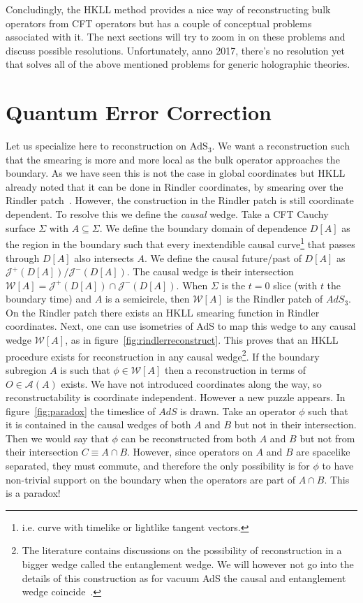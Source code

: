 \documentclass{PoS}
\newcommand{\Am}{\ensuremath{\mathcal{A}}}
\newcommand{\LF}{\left(}
\newcommand{\RF}{\right)}
\begin{document}
Concludingly, the HKLL method provides a nice way of reconstructing bulk operators from CFT operators but has a couple of conceptual problems associated with it. The next sections will try to zoom in on these problems and discuss possible resolutions. Unfortunately, anno 2017, there's no resolution yet that solves all of the above mentioned problems for generic holographic theories.

\section{Quantum Error Correction}
\label{sec:QEC}
Let us specialize here to reconstruction on $\text{AdS}_3$. We want a reconstruction such that the smearing is more and more local as the bulk operator approaches the boundary. As we have seen this is not the case in global coordinates but HKLL already noted that it can be done in Rindler coordinates, by smearing over the Rindler patch~\cite{Hamilton:2006fh,Hamilton:2006az}. However, the construction in the Rindler patch is still coordinate dependent. To resolve this we define the \textit{causal} wedge. Take a CFT Cauchy surface $\Sigma$ with $A\subseteq\Sigma$. We define the boundary domain of dependence $D[A]$ as the region in the boundary such that every inextendible causal curve\footnote{i.e. curve with timelike or lightlike tangent vectors.} that passes through $D[A]$ also intersects $A$. We define the causal future/past of $D[A]$ as $\mathcal{J}^{+}\LF D[A]\RF / \mathcal{J}^{-}\LF D[A]\RF$. The causal wedge is their intersection $\mathcal{W}[A] = \mathcal{J}^{+}\LF D[A]\RF \cap \mathcal{J}^{-}\LF D[A]\RF$. When $\Sigma$ is the $t=0$ slice (with $t$ the boundary time) and $A$ is a semicircle, then $\mathcal{W}[A]$ is the Rindler patch of $AdS_3$. On the Rindler patch there exists an HKLL smearing function in Rindler coordinates. Next, one can use isometries of AdS to map this wedge to any causal wedge $\mathcal{W}[A]$, as in figure~\ref{fig:rindlerreconstruct}. This proves that an HKLL procedure exists for reconstruction in any causal wedge\footnote{The literature contains discussions on the possibility of reconstruction in a bigger wedge called the entanglement wedge. We will however not go into the details of this construction as for vacuum AdS the causal and entanglement wedge coincide~\cite{Hubeny:2012wa,Headrick:2014cta}.}. If the boundary subregion $A$ is such that $\phi \in \mathcal{W}[A]$ then a reconstruction in terms of $O\in \Am(A)$ exists. We have not introduced coordinates along the way, so reconstructability is coordinate independent. However a new puzzle appears. In figure~\ref{fig:paradox} the timeslice of $AdS$ is drawn. Take an operator $\phi$ such that it is contained in the causal wedges of both $A$ and $B$ but not in their intersection. Then we would say that $\phi$ can be reconstructed from both $A$ and $B$ but not from their intersection $C\equiv A\cap B$. However, since operators on $A$ and $B$ are spacelike separated, they must commute, and therefore the only possibility is for $\phi$ to have non-trivial support on the boundary when the operators are part of $A\cap B$. This is a paradox!\\
\end{document}
